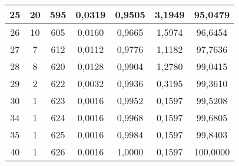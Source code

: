 \documentclass[compress,red,mathsans,10pt]{beamer}
\begin{document}
{{\begin{center}
\begin{tabular}{|c|c|c|c|c|c|c|}
25&20	&595	&0,0319	&0,9505	&3,1949	 &95,0479 \\ \hline
26&10	&605	&0,0160	&0,9665	&1,5974	 &96,6454 \\ \hline
27&7	&612	&0,0112	&0,9776	&1,1182	 &97,7636 \\ \hline
28&8	&620	&0,0128	&0,9904	&1,2780	 &99,0415 \\ \hline
29&2	&622	&0,0032	&0,9936	&0,3195	 &99,3610 \\ \hline
30&1	&623	&0,0016	&0,9952	&0,1597	 &99,5208 \\ \hline
34&1	&624	&0,0016	&0,9968	&0,1597	 &99,6805 \\ \hline
35&1	&625	&0,0016	&0,9984	&0,1597	 &99,8403 \\ \hline
40&1	&626	&0,0016	&1,0000	&0,1597	 &100,0000 \\ \hline
\end{tabular}
\end{center}
}
}
\end{document}
